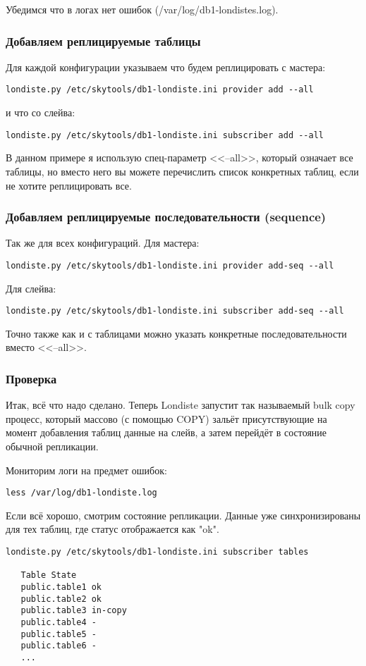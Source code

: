 Убедимся что в логах нет ошибок (/var/log/db1-londistes.log).

\subsubsection{Добавляем реплицируемые таблицы}
Для каждой конфигурации указываем что будем реплицировать с мастера:
\begin{verbatim}
londiste.py /etc/skytools/db1-londiste.ini provider add --all
\end{verbatim}
и что со слейва:
\begin{verbatim}
londiste.py /etc/skytools/db1-londiste.ini subscriber add --all
\end{verbatim}

В данном примере я использую спец-параметр <<--all>>, который означает все таблицы,
но вместо него вы можете перечислить список конкретных таблиц, если не хотите
реплицировать все.

\subsubsection{Добавляем реплицируемые последовательности (sequence)}
Так же для всех конфигураций.
Для мастера:
\begin{verbatim}
londiste.py /etc/skytools/db1-londiste.ini provider add-seq --all
\end{verbatim}
Для слейва:
\begin{verbatim}
londiste.py /etc/skytools/db1-londiste.ini subscriber add-seq --all
\end{verbatim}

Точно также как и с таблицами можно указать конкретные последовательности вместо <<--all>>.

\subsubsection{Проверка}
Итак, всё что надо сделано. Теперь Londiste запустит так называемый bulk copy
процесс, который массово (с помощью COPY) зальёт присутствующие на момент
добавления таблиц данные на слейв, а затем перейдёт в состояние обычной репликации.

Мониторим логи на предмет ошибок:
\begin{verbatim}
less /var/log/db1-londiste.log
\end{verbatim}

Если всё хорошо, смотрим состояние репликации. Данные уже синхронизированы для
тех таблиц, где статус отображается как "ok".
\begin{verbatim}
londiste.py /etc/skytools/db1-londiste.ini subscriber tables

   Table State
   public.table1 ok
   public.table2 ok
   public.table3 in-copy
   public.table4 -
   public.table5 -
   public.table6 -
   ...
\end{verbatim}

